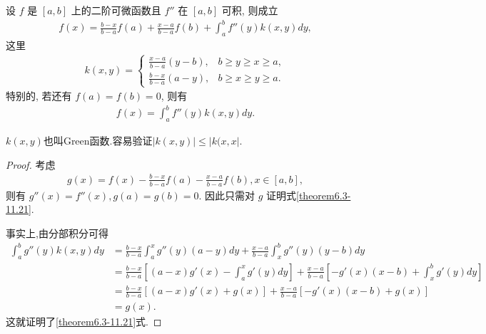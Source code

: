 \documentclass[../../main.tex]{subfiles}
\begin{document}
\begin{theorem}[带积分型余项的Lagrange插值公式]\label{theorem:带积分型余项的Lagrange插值公式}
设 $f$ 是 $[a,b]$ 上的二阶可微函数且 $f''$ 在 $[a,b]$ 可积, 则成立
\begin{align*}
f(x) = \frac{b-x}{b-a} f(a) + \frac{x-a}{b-a} f(b) + \int_{a}^{b} f''(y) k(x,y) dy,
\end{align*}
这里
\begin{align*}
k(x,y) = 
\begin{cases}
\frac{x-a}{b-a} (y-b), & b \geq y \geq x \geq a, \\
\frac{b-x}{b-a} (a-y), & b \geq x \geq y \geq a.
\end{cases}
\end{align*}
特别的, 若还有 $f(a) = f(b) = 0$, 则有
\begin{align}
f(x) = \int_{a}^{b} f''(y) k(x,y) dy.\label{theorem6.3-11.21}
\end{align}
\end{theorem}
\begin{note}
$k(x,y)$也叫Green函数.容易验证$|k(x,y)|\leq |k(x,x|$.
\end{note}
\begin{proof}
考虑
\begin{align*}
g(x) = f(x) - \frac{b-x}{b-a} f(a) - \frac{x-a}{b-a} f(b), x \in [a,b],
\end{align*}
则有 $g''(x) = f''(x), g(a) = g(b) = 0$. 因此只需对 $g$ 证明式\eqref{theorem6.3-11.21}.

事实上,由分部积分可得
\begin{align*}
\int_{a}^{b} g''(y) k(x,y) dy &= \frac{b-x}{b-a} \int_{a}^{x} g''(y) (a-y) dy + \frac{x-a}{b-a} \int_{x}^{b} g''(y) (y-b) dy \\
&= \frac{b-x}{b-a} \left[ (a-x) g'(x) - \int_{a}^{x} g'(y) dy \right] + \frac{x-a}{b-a} \left[ -g'(x) (x-b) + \int_{x}^{b} g'(y) dy \right] \\
&= \frac{b-x}{b-a} [(a-x) g'(x) + g(x)] + \frac{x-a}{b-a} [-g'(x) (x-b) + g(x)] \\
&= g(x).
\end{align*}
这就证明了\eqref{theorem6.3-11.21}式.
\end{proof}
\end{document}
